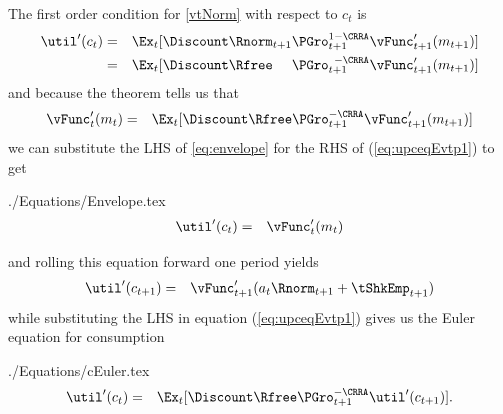 \documentclass[titlepage]{\econtex}
\begin{document}
The first order condition for \eqref{vtNorm} with respect to ${c}_{t}$ is
\begin{eqnarray}
  \util^{\prime}({c}_{t}) & = & \Ex_{t}[\Discount \Rnorm_{t+1}\PGro_{t+1}^{1-\CRRA}\null{\vFunc}^{\prime}_{t+1}({m}_{t+1})]  \nonumber 
  \\  & = &  \Ex_{t}[\Discount\Rfree\phantom{_{t+1}}\PGro_{t+1}^{\phantom{1}-\CRRA}\null{\vFunc}^{\prime}_{t+1}({m}_{t+1})] \label{eq:upceqEvtp1}
\end{eqnarray}
and because the  theorem tells us that
\begin{eqnarray}
  \null{\vFunc}^{\prime}_{t}({m}_{t}) & = &  \Ex_{t} [\Discount\Rfree\PGro_{t+1}^{-\CRRA}\null{\vFunc}^{\prime}_{t+1}({m}_{t+1})] \label{eq:envelope}
\end{eqnarray}
we can substitute the LHS of \eqref{eq:envelope} for the RHS of
(\ref{eq:upceqEvtp1}) to get
\begin{verbatimwrite}{./Equations/Envelope.tex}
  \begin{eqnarray}
    \util^{\prime}({c}_{t}) & = & \null{\vFunc}^{\prime}_{t}({m}_{t})\label{eq:Envelope}
  \end{eqnarray}
\end{verbatimwrite}

and rolling this equation forward one period yields
\begin{eqnarray}
  \util^{\prime}({c}_{t+1}) & = & \null{\vFunc}^{\prime}_{t+1}({a}_{t}\Rnorm_{t+1}+\tShkEmp_{t+1}) \label{eq:upctp1EqVpxtp1}
\end{eqnarray}
while substituting the LHS in equation (\ref{eq:upceqEvtp1})
gives us the Euler equation for consumption
\begin{verbatimwrite}{./Equations/cEuler.tex}
  \begin{eqnarray}
    \util^{\prime}({c}_{t}) & = & \Ex_{t}[\Discount\Rfree \PGro_{t+1}^{-\CRRA}\util^{\prime}({c}_{t+1})]. \label{eq:cEuler}
  \end{eqnarray}
\end{verbatimwrite}

\end{document}
